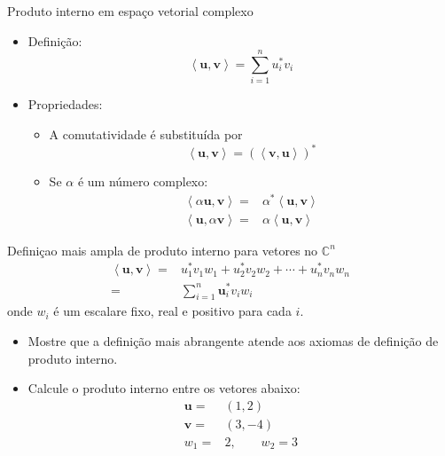     \begin{slide}[toc=]{Produto interno em espaço vetorial complexo}
	     \begin{itemize}
		     \item Definição:
			     \begin{equation*}
				     \left < \mathbf u, \mathbf v\right > = \sum_{i=1}^n u_i^\ast v_i
			     \end{equation*}
		     \item Propriedades:
			     \begin{itemize}
				     \item A comutatividade é substituída por
					     \begin{equation*}
						     \left < \mathbf u, \mathbf v\right > = \left (\left < \mathbf v, \mathbf u\right > \right )^\ast
					     \end{equation*}
				     \item Se $\alpha$ é um número complexo:
					     \begin{align*}
						     \left <\alpha \mathbf u, \mathbf v\right > =&\alpha^\ast \left < \mathbf u, \mathbf v\right >\\ 
						     \left <\mathbf u, \alpha \mathbf v\right > =&\alpha \left < \mathbf u, \mathbf v\right > 
					     \end{align*}
			     \end{itemize}
	     \end{itemize}
     \end{slide}
     
     \begin{slide}[toc=]{Definiçao mais ampla de produto interno para vetores no $\mathbb C^n$}
	     \begin{align*}
		     \left < \mathbf u, \mathbf v\right > =& u_1^\ast v_1 w_1 + u_2^\ast v_2 w_2+ \cdots + u_n^\ast v_n w_n \\
		     =& \sum_{i=1}^n \mathbf u_i^\ast v_i w_i
	     \end{align*}
	     onde $w_i$ é um escalare fixo, real e positivo para cada $i$.
	     \begin{itemize}
		     \item Mostre que a definição mais abrangente atende aos axiomas de definição de produto interno.
		     \item Calcule o produto interno entre os vetores abaixo:
			     \begin{align*}
				     \mathbf u =& (1,2)\\
				     \mathbf v =& (3,-4)\\
				     w_1 =& 2, \qquad w_2 = 3
			     \end{align*}
	     \end{itemize}
     \end{slide}

